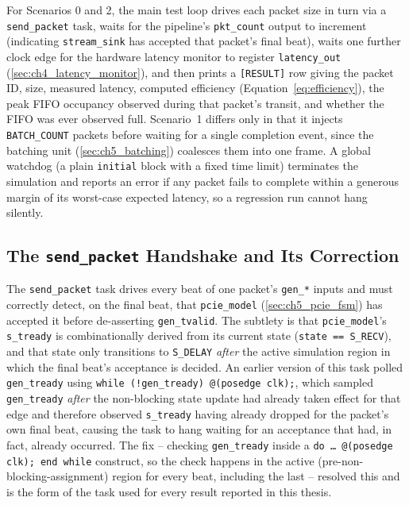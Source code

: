 For Scenarios 0 and 2, the main test loop drives each packet size in turn via a \texttt{send\_packet} task, waits for the pipeline's \texttt{pkt\_count} output to increment (indicating \texttt{stream\_sink} has accepted that packet's final beat), waits one further clock edge for the hardware latency monitor to register \texttt{latency\_out} (\autoref{sec:ch4_latency_monitor}), and then prints a \texttt{[RESULT]} row giving the packet ID, size, measured latency, computed efficiency (Equation~\ref{eq:efficiency}), the peak FIFO occupancy observed during that packet's transit, and whether the FIFO was ever observed full. Scenario~1 differs only in that it injects \texttt{BATCH\_COUNT} packets before waiting for a single completion event, since the batching unit (\autoref{sec:ch5_batching}) coalesces them into one frame. A global watchdog (a plain \texttt{initial} block with a fixed time limit) terminates the simulation and reports an error if any packet fails to complete within a generous margin of its worst-case expected latency, so a regression run cannot hang silently.

\subsection{The \texttt{send\_packet} Handshake and Its Correction}
\label{sec:ch6_send_packet}

The \texttt{send\_packet} task drives every beat of one packet's \texttt{gen\_*} inputs and must correctly detect, on the final beat, that \texttt{pcie\_model} (\autoref{sec:ch5_pcie_fsm}) has accepted it before de-asserting \texttt{gen\_tvalid}. The subtlety is that \texttt{pcie\_model}'s \texttt{s\_tready} is combinationally derived from its current state (\texttt{state == S\_RECV}), and that state only transitions to \texttt{S\_DELAY} \emph{after} the active simulation region in which the final beat's acceptance is decided. An earlier version of this task polled \texttt{gen\_tready} using \texttt{while (!gen\_tready) @(posedge clk);}, which sampled \texttt{gen\_tready} \emph{after} the non-blocking state update had already taken effect for that edge and therefore observed \texttt{s\_tready} having already dropped for the packet's own final beat, causing the task to hang waiting for an acceptance that had, in fact, already occurred. The fix -- checking \texttt{gen\_tready} inside a \texttt{do \ldots\ @(posedge clk); end while} construct, so the check happens in the active (pre-non-blocking-assignment) region for every beat, including the last -- resolved this and is the form of the task used for every result reported in this thesis.


